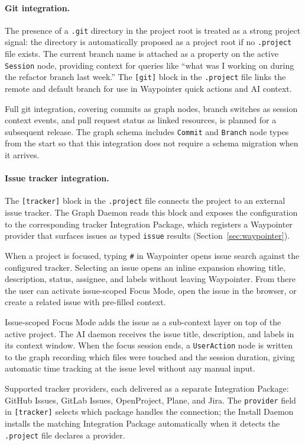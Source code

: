 \paragraph{Git integration.}
The presence of a \texttt{.git} directory in the project root is treated as a
strong project signal: the directory is automatically proposed as a project
root if no \texttt{.project} file exists. The current branch name is attached
as a property on the active \texttt{Session} node, providing context for
queries like ``what was I working on during the refactor branch last week.''
The \texttt{[git]} block in the \texttt{.project} file links the remote and
default branch for use in Waypointer quick actions and AI context.

Full git integration, covering commits as graph nodes, branch switches as
session context events, and pull request status as linked resources, is
planned for a subsequent release. The graph schema includes \texttt{Commit}
and \texttt{Branch} node types from the start so that this integration does
not require a schema migration when it arrives.

\paragraph{Issue tracker integration.}
The \texttt{[tracker]} block in the \texttt{.project} file connects the
project to an external issue tracker. The Graph Daemon reads this block and
exposes the configuration to the corresponding tracker Integration Package,
which registers a Waypointer provider that surfaces issues as typed
\texttt{issue} results (Section~\ref{sec:waypointer}).

When a project is focused, typing \texttt{\#} in Waypointer opens issue
search against the configured tracker. Selecting an issue opens an inline
expansion showing title, description, status, assignee, and labels without
leaving Waypointer. From there the user can activate issue-scoped Focus Mode,
open the issue in the browser, or create a related issue with pre-filled
context.

Issue-scoped Focus Mode adds the issue as a sub-context layer on top of the
active project. The AI daemon receives the issue title, description, and
labels in its context window. When the focus session ends, a
\texttt{UserAction} node is written to the graph recording which files were
touched and the session duration, giving automatic time tracking at the issue
level without any manual input.

Supported tracker providers, each delivered as a separate Integration Package:
GitHub Issues, GitLab Issues, OpenProject, Plane, and Jira. The
\texttt{provider} field in \texttt{[tracker]} selects which package handles
the connection; the Install Daemon installs the matching Integration Package
automatically when it detects the \texttt{.project} file declares a provider.

